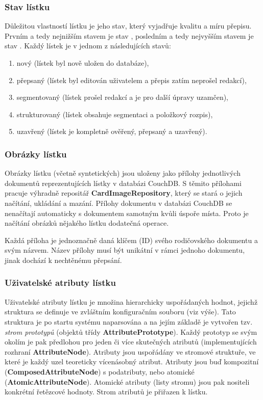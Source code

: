 \subsubsection{Stav lístku}

Důležitou vlastností lístku je jeho stav, který vyjadřuje kvalitu a míru přepisu. Prvním a tedy nejnižším stavem je stav , posledním a tedy nejvyšším stavem je stav . Každý lístek je v jednom z následujících stavů:

\begin{enumerate}
\item{nový (lístek byl nově uložen do databáze),}
\item{přepsaný (lístek byl editován uživatelem a přepis zatím neprošel redakcí),}
\item{segmentovaný (lístek prošel redakcí a je pro další úpravy uzamčen),}
\item{strukturovaný (lístek obsahuje segmentaci a položkový rozpis),}
\item{uzavřený (lístek je kompletně ověřený, přepsaný a uzavřený).}
\end{enumerate}

\subsubsection{Obrázky lístku}

Obrázky lístku (včetně syntetických) jsou uloženy jako přílohy jednotlivých dokumentů reprezentujících lístky v databázi CouchDB. S těmito přílohami pracuje výhradně repositář {\bf CardImageRepository}, který se stará o jejich načítání, ukládání a mazání. Přílohy dokumentu v databázi CouchDB se nenačítají automaticky s dokumentem samotným kvůli úspoře místa. Proto je načítání obrázků nějakého lístku dodatečná operace.

Každá příloha je jednoznačně daná klíčem (ID) svého rodičovského dokumentu a svým názvem. Název přílohy musí být unikátní v rámci jednoho dokumentu, jinak dochází k nechtěnému přepsání.

\subsubsection{Uživatelské atributy lístku}

Uživatelské atributy lístku je množina hierarchicky uspořádaných hodnot, jejichž struktura se definuje ve zvláštním konfiguračním souboru (viz výše). Tato struktura je po startu systému naparsována a na jejím základě je vytvořen tzv. {\em strom prototypů} (objektů třídy {\bf AttributePrototype}). Každý prototyp se svým okolím je pak předlohou pro jeden či více skutečných atributů (implementujících rozhraní {\bf AttributeNode}). Atributy jsou uspořádány ve stromové struktuře, ve které je každý uzel teoreticky vícenásobný atribut. Atributy jsou buď kompozitní ({\bf ComposedAttributeNode}) s podatributy, nebo atomické ({\bf AtomicAttributeNode}). Atomické atributy (listy stromu) jsou pak nositeli konkrétní řetězcové hodnoty. Strom atributů je přiřazen k lístku.

